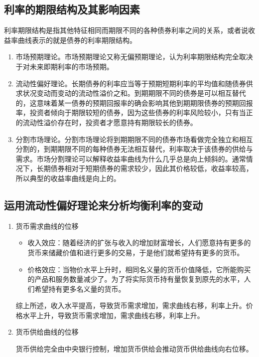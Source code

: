 \documentclass{article}
\begin{document}
\subsection{利率的期限结构及其影响因素}

利率期限结构是指其他特征相同而期限不同的各种债券利率之间的关系，或者说收益率曲线表示的就是债券的利率期限结构。
\begin{enumerate}
	\item 市场预期理论。市场预期理论又称无偏预期理论，认为利率期限结构完全取决于对未来即期利率的市场预期。
	\item 流动性偏好理论。长期债券的利率应当等于预期短期利率的平均值和随债券供求状况变动而变动的流动性溢价之和。到期期限不同的债券是可以相互替代的，这意味着某一债券的预期回报率的确会影响其他到期期限债券的预期回报率，投资者倾向于期限较短的债券，因为这些债券的利率风险较小，只有当正的流动性溢价存在时，投资者才愿意持有期限较长的债券。
	\item 分割市场理论。分割市场理论将到期期限不同的债券市场看做完全独立和相互分割的，到期期限不同的每种债券无法相互替代，利率取决于该债券的供给与需求。市场分割理论可以解释收益率曲线为什么几乎总是向上倾斜的。通常情况下，长期债券相对于短期债券的需求较少，因此其价格较低，收益率较高，所以典型的收益率曲线是向上的。
\end{enumerate}

\subsection{运用流动性偏好理论来分析均衡利率的变动}

\begin{enumerate}
	\item 货币需求曲线的位移
	\begin{itemize}
		\item 收入效应：随着经济的扩张与收入的增加财富增长，人们愿意持有更多的货币来储藏价值和进行更多的交易，于是他们就希望持有更多的货币。
		\item 价格效应：当物价水平上升时，相同名义量的货币价值降低，它所能购买的产品和服务数量减少了。为了将实际货币持有量恢复到原先的水平，人们希望持有更多名义量的货币。
	\end{itemize}
	综上所述，收入水平提高，导致货币需求增加，需求曲线右移，利率上升。价格水平上升，导致货币需求增加，需求曲线右移，利率上升。

	\item 货币供给曲线的位移
  
	货币供给完全由中央银行控制，增加货币供给会推动货币供给曲线向右位移。
\end{enumerate}
\end{document}
